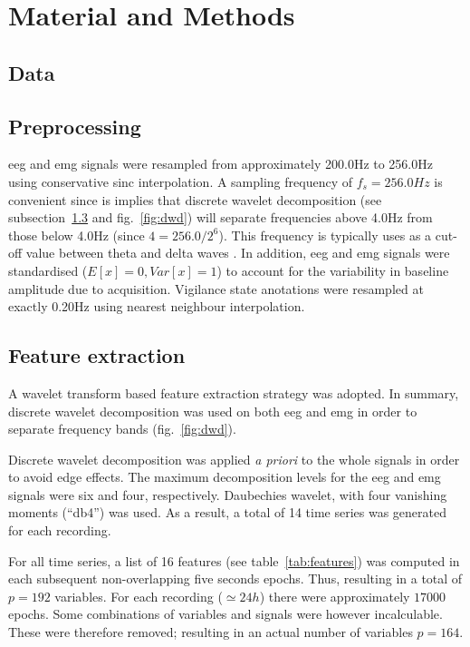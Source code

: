 \section{Material and Methods} \label{matmet}

\subsection{Data}

\subsection{Preprocessing}

\gls{eeg} and \gls{emg} signals were resampled from approximately 200.0Hz to 256.0Hz using
conservative sinc interpolation.
A sampling frequency of $f_s  = 256.0Hz$ is convenient since is implies that discrete wavelet decomposition (see subsection~\ref{sub:features} and fig.~\ref{fig:dwd}) will separate
frequencies above 4.0Hz from those below 4.0Hz (since $4 = 256.0/{2^6} $).
This frequency is typically uses as a cut-off value between theta and delta waves \citationneeded{}.
In addition, \gls{eeg} and \gls{emg} signals were standardised ($E[x] = 0, Var[x] = 1$) to account for the variability in baseline amplitude due to acquisition.
Vigilance state anotations were resampled at exactly 0.20Hz using nearest neighbour interpolation.

\subsection{Feature extraction}
\label{sub:features}

A wavelet transform based feature extraction strategy was adopted.
In summary, discrete wavelet decomposition was used on both \gls{eeg} and \gls{emg}
in order to separate frequency bands (fig.~\ref{fig:dwd}).



Discrete wavelet decomposition was applied \emph{a priori} to the whole signals in order to avoid edge effects.
The maximum decomposition levels for the \gls{eeg} and \gls{emg} signals were six and four, respectively.
Daubechies wavelet, with four vanishing moments (``db4'') was used.
As a result, a total of 14 time series was generated for each recording.

For all time series, a list of 16 features (see table~\ref{tab:features}) was computed in each subsequent non-overlapping five seconds epochs.
Thus, resulting in a total of $p=192$ variables. 
For each recording ($\simeq 24h$) there were approximately $17000$ epochs.
Some combinations of variables and signals were however incalculable.
These were therefore removed; resulting in an actual number of variables $p=164$.

